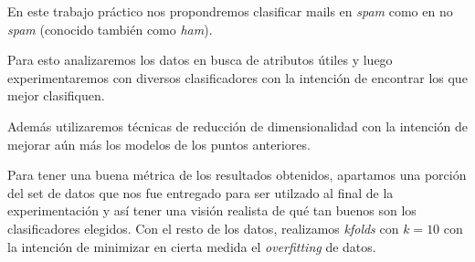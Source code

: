 En este trabajo práctico nos propondremos clasificar mails en \textit{spam} como en no \textit{spam} (conocido también como \textit{ham}).

Para esto analizaremos los datos en busca de atributos útiles y luego experimentaremos con diversos clasificadores con la intención de encontrar los que mejor clasifiquen.

Además utilizaremos técnicas de reducción de dimensionalidad con la intención de mejorar aún más los modelos de los puntos anteriores.

Para tener una buena métrica de los resultados obtenidos, apartamos una porción del set de datos que nos fue entregado para ser utilzado al final de la experimentación y así tener una visión realista de qué tan buenos son los clasificadores elegidos. Con el resto de los datos, realizamos \textit{kfolds} con $k = 10$ con la intención de minimizar en cierta medida el \textit{overfitting} de datos.